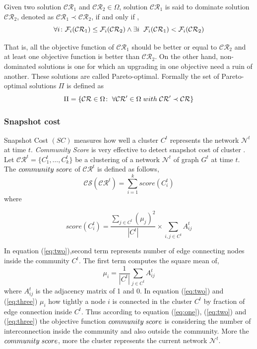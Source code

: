 \documentclass[12pt]{arsubmit}
\begin{document}
Given two solution $\mathcal{CR}_1$ and $\mathcal{CR}_2 \in \Omega$, solution $\mathcal{CR}_1$ is said to dominate solution $\mathcal{CR}_2$, denoted as $\mathcal{CR}_1 \prec \mathcal{CR}_2$, if and only if , \[\forall i \colon \mathcal{F}_i(\mathcal{CR}_1) \leq \mathcal{F}_i(\mathcal{CR}_2) \wedge \exists i\hspace {2 mm} \mathcal{F}_i(\mathcal{CR}_1)<\mathcal{F}_i(\mathcal{CR}_2)\]

That is, all the objective function of $\mathcal{CR}_1$ should be better or equal to $\mathcal{CR}_2$ and at least one objective function is better than $\mathcal{CR}_2$. On the other hand, non-dominated solutions is one for which an upgrading in one objective need a ruin of another. These solutions are called Pareto-optimal. Formally the set of Pareto-optimal solutions $\Pi$ is defined as \[\Pi = \{ \mathcal{CR} \in \Omega \colon \hspace {1 mm} \forall \mathcal{CR}' \in \Omega \hspace {1 mm}with \hspace {1 mm}\mathcal{CR}' \prec \mathcal{CR}\}\]



\subsubsection{ Snapshot cost} 
Snapshot Cost $(SC)$ measures how well a cluster $C^t$ represents the network $\mathcal{N}^t$ at time $t$.  \emph{Community Score} is very effective to detect snapshot cost of cluster \cite{dynmoga19}. Let $\mathcal{CR}^t = \{C_1^t,\ldots,C_k^t\}$ be a clustering of a network $\mathcal{N}^t$ of graph $G^t$ at time $t$. The $community\hspace{1 mm} score$ of $\mathcal{CR}^t$ is defined as follows, 
\begin{equation} \mathcal{CS}(\mathcal{CR}^t) = \sum\limits_{i=1}^k score(C_i^t) \label {eq:one}
\end{equation} where 

\begin{equation} 
score(C_i^t) = \frac{\sum\nolimits_{j\in C^t} {({\mu}_j )}^2} {|C^t|} \times \sum\limits_{i,j\in C^t} A_{ij}^t  \label{eq:two} 
\end{equation}

In equation (\ref{eq:two}),second term represents number of edge connecting nodes inside the community $C^t$. The first term computes the square mean of, \begin{equation} {\mu}_i = \frac{1} {|C^t|} \sum\limits_{j\in C^t} A_{ij}^t\label{eq:three}\end{equation} where $A_{ij}^t$ is the adjacency matrix of 1 and 0.
In equation (\ref{eq:two}) and (\ref{eq:three}) ${\mu}_i$ how tightly a node $i$ is connected in the cluster $C^t$ by fraction of edge connection inside $C^t$.
Thus according to equation (\ref{eq:one}), (\ref{eq:two}) and (\ref{eq:three}) the objective function $community \hspace{1 mm} score$ is considering the number of interconnection inside the community and also outside the community.
More the $community\hspace{1 mm}score$, more the cluster represents the current network $\mathcal{N}^t$.\\
\end{document}
